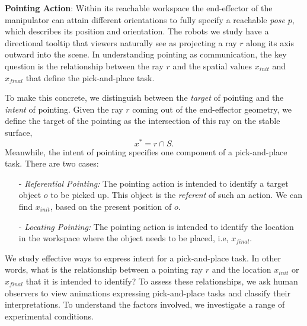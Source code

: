 \noindent\textbf{Pointing Action}: Within its reachable workspace the end-effector of the manipulator can attain different orientations to fully specify a reachable \textit{pose} $p$, which describes its position and orientation.  The robots we study have a directional tooltip that viewers naturally see as projecting a ray $r$ along its axis outward into the scene.  In understanding pointing as communication, the key question is the relationship between the ray $r$ and the spatial values $x_{init}$ and $x_{final}$ that define the pick-and-place task.


To make this concrete, we distinguish between the \emph{target} of pointing and the \emph{intent} of pointing. Given the ray $r$ coming out of the end-effector geometry, we define the target of the pointing as the intersection of this ray on the stable surface, $$x^*= r\cap S.$$ Meanwhile, the intent of pointing specifies one component of a pick-and-place task.  There are two cases:
\begin{itemize}
    \item [-] \textit{Referential Pointing:} The pointing action is intended to identify a target object $o$ to be picked up. This object is the \textit{referent} of such an action. We can find $x_{init}$, based on the present position of $o$.
    \item [-] \textit{Locating Pointing:} The pointing action is intended to identify the location in the workspace where the object needs to be placed, i.e, $x_{final}$.
\end{itemize}


We study effective ways to express intent for a pick-and-place task. In other words, what is the relationship between a pointing ray $r$ and the location $x_{init}$ or $x_{final}$ that it is intended to identify?  To assess these relationships, we ask human observers to view animations expressing pick-and-place tasks and classify their interpretations.  To understand the factors involved, we investigate a range of experimental conditions.


